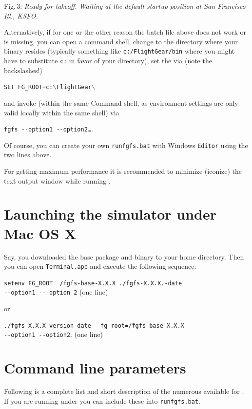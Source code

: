  \noindent
Fig.\,3: \textit{Ready for takeoff. Waiting at the default startup position at San
Francisco Itl., KSFO.}
\medskip

Alternatively, if for one or the other reason the batch file above does not work or is missing,
you can open a command shell, change to the directory where your binary resides
(typically something like \texttt{c:/FlightGear/bin} where you might have to substitute
\texttt{c:} in favor of your \FlightGear{} directory), set the  via (note the backslashes!)
 \medskip

\texttt{SET FG\_ROOT=c:$\backslash$FlightGear$\backslash$}
 \medskip

\noindent
 and invoke \FlightGear{} (within the same Command shell, as environment
 settings are only valid locally within the same shell) via
  \medskip

\texttt{fgfs -$ $-option1 -$ $-option2\dots}.
 \medskip

Of course,  you can create your own \texttt{runfgfs.bat} with Windows \texttt{Editor} using the
two lines above.

For getting maximum performance it is recommended to minimize (iconize) the text output
window while running \FlightGear{}$\!$.

\section{Launching the simulator under Mac OS X}
Say, you downloaded the base package and binary to your home directory. Then you can open \texttt{Terminal.app} and execute the following sequence:
\medskip

\noindent
\texttt{setenv FG\_ROOT ~/fgfs-base-X.X.X ./fgfs-X.X.X.-date}\\
\texttt{-$ $-option1 -$ $- option 2} (one line)
\medskip

\noindent
or
\medskip

\noindent
\texttt{./fgfs-X.X.X-version-date}
 \texttt{-$ $-fg-root=\~/fgfs-base-X.X.X}\\
 \texttt{-$ $-option1 -$ $-option2}. (one line)

\section{Command line parameters\label{options}}
Following is a complete list and short description of the numerous 
available for \FlightGear{}$\!$. If you are running \FlightGear{} under  you can include these into
\texttt{runfgfs.bat}.

